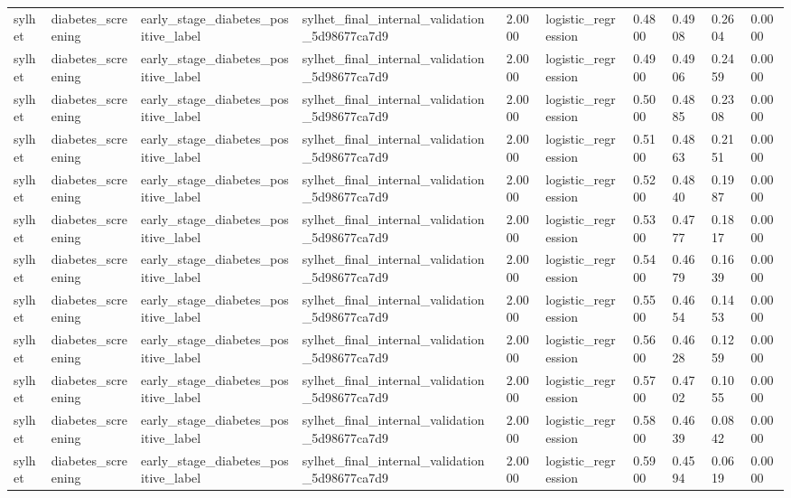 \begin{tabular}{llllllllll}
sylhet & diabetes\_screening & early\_stage\_diabetes\_positive\_label & sylhet\_final\_internal\_validation\_5d98677ca7d9 & 2.0000 & logistic\_regression & 0.4800 & 0.4908 & 0.2604 & 0.0000 \\
sylhet & diabetes\_screening & early\_stage\_diabetes\_positive\_label & sylhet\_final\_internal\_validation\_5d98677ca7d9 & 2.0000 & logistic\_regression & 0.4900 & 0.4906 & 0.2459 & 0.0000 \\
sylhet & diabetes\_screening & early\_stage\_diabetes\_positive\_label & sylhet\_final\_internal\_validation\_5d98677ca7d9 & 2.0000 & logistic\_regression & 0.5000 & 0.4885 & 0.2308 & 0.0000 \\
sylhet & diabetes\_screening & early\_stage\_diabetes\_positive\_label & sylhet\_final\_internal\_validation\_5d98677ca7d9 & 2.0000 & logistic\_regression & 0.5100 & 0.4863 & 0.2151 & 0.0000 \\
sylhet & diabetes\_screening & early\_stage\_diabetes\_positive\_label & sylhet\_final\_internal\_validation\_5d98677ca7d9 & 2.0000 & logistic\_regression & 0.5200 & 0.4840 & 0.1987 & 0.0000 \\
sylhet & diabetes\_screening & early\_stage\_diabetes\_positive\_label & sylhet\_final\_internal\_validation\_5d98677ca7d9 & 2.0000 & logistic\_regression & 0.5300 & 0.4777 & 0.1817 & 0.0000 \\
sylhet & diabetes\_screening & early\_stage\_diabetes\_positive\_label & sylhet\_final\_internal\_validation\_5d98677ca7d9 & 2.0000 & logistic\_regression & 0.5400 & 0.4679 & 0.1639 & 0.0000 \\
sylhet & diabetes\_screening & early\_stage\_diabetes\_positive\_label & sylhet\_final\_internal\_validation\_5d98677ca7d9 & 2.0000 & logistic\_regression & 0.5500 & 0.4654 & 0.1453 & 0.0000 \\
sylhet & diabetes\_screening & early\_stage\_diabetes\_positive\_label & sylhet\_final\_internal\_validation\_5d98677ca7d9 & 2.0000 & logistic\_regression & 0.5600 & 0.4628 & 0.1259 & 0.0000 \\
sylhet & diabetes\_screening & early\_stage\_diabetes\_positive\_label & sylhet\_final\_internal\_validation\_5d98677ca7d9 & 2.0000 & logistic\_regression & 0.5700 & 0.4702 & 0.1055 & 0.0000 \\
sylhet & diabetes\_screening & early\_stage\_diabetes\_positive\_label & sylhet\_final\_internal\_validation\_5d98677ca7d9 & 2.0000 & logistic\_regression & 0.5800 & 0.4639 & 0.0842 & 0.0000 \\
sylhet & diabetes\_screening & early\_stage\_diabetes\_positive\_label & sylhet\_final\_internal\_validation\_5d98677ca7d9 & 2.0000 & logistic\_regression & 0.5900 & 0.4594 & 0.0619 & 0.0000 \\

\end{tabular}
